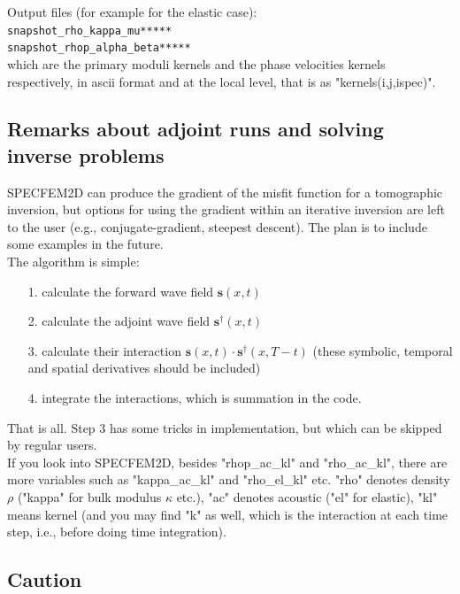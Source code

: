 \documentclass[oneside,english,onecolumn,letterpaper]{book}
\begin{document}
\begin{enumerate}
Output files (for example for the elastic case):\\
\texttt{snapshot\_rho\_kappa\_mu*****}\\
\texttt{snapshot\_rhop\_alpha\_beta*****}\\
which are the primary moduli kernels and the phase velocities kernels respectively, in ascii format
and at the local level, that is as "kernels(i,j,ispec)".

\end{enumerate}

\subsection*{Remarks about adjoint runs and solving inverse problems}

SPECFEM2D can produce the gradient of the misfit function for a
tomographic inversion, but options for using the gradient within an
iterative inversion are left to the user (e.g., conjugate-gradient,
steepest descent). The plan is to include some examples in the future.\\

The algorithm is simple:

\begin{enumerate}
\item[1.] calculate the forward wave field $\mathbf{s}(x,t)$
\item[2.] calculate the adjoint wave field $\mathbf{s}^\dagger(x,t)$
\item[3.] calculate their interaction $\mathbf{s}(x,t) \cdot \mathbf{s}^\dagger(x,T-t)$ (these symbolic, temporal and spatial derivatives should be included)
\item[4.] integrate the interactions, which is summation in the code.
\end{enumerate}

That is all. Step 3 has some tricks in implementation, but which can be skipped by regular users.\\

If you look into SPECFEM2D, besides "rhop\_ac\_kl" and "rho\_ac\_kl",
there are more variables such as "kappa\_ac\_kl" and "rho\_el\_kl" etc.
"rho" denotes density $\rho$ ("kappa" for bulk modulus $\kappa$ etc.),
"ac" denotes acoustic ("el" for elastic),
"kl" means kernel (and you may find "k" as well, which is the interaction at each time step, i.e., before doing time integration).

\subsection*{Caution}
\end{document}
